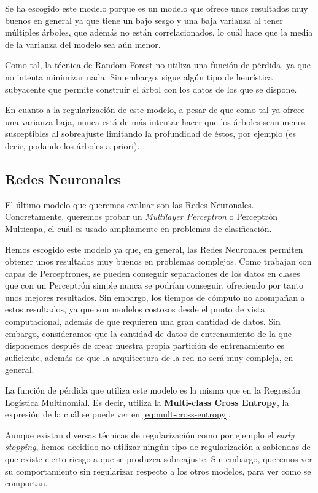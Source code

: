\documentclass[11pt,a4paper]{article}
\begin{document}
Se ha escogido este modelo porque es un modelo que ofrece unos resultados muy buenos en general ya que tiene un bajo sesgo y una baja varianza
al tener múltiples árboles, que además no están correlacionados, lo cuál hace que la media de la varianza del modelo sea aún menor.

Como tal, la técnica de Random Forest no utiliza una función de pérdida, ya que no intenta minimizar nada. Sin embargo, sigue algún tipo de
heurística subyacente que permite construir el árbol con los datos de los que se dispone.

En cuanto a la regularización de este modelo, a pesar de que como tal ya ofrece una varianza baja, nunca está de más intentar hacer que
los árboles sean menos susceptibles al sobreajuste limitando la profundidad de éstos, por ejemplo (es decir, podando los árboles a priori).

\subsection{Redes Neuronales}

El último modelo que queremos evaluar son las Redes Neuronales. Concretamente, queremos probar un \textit{Multilayer Perceptron} o Perceptrón
Multicapa, el cuál es usado ampliamente en problemas de clasificación.

Hemos escogido este modelo ya que, en general, las Redes Neuronales permiten obtener unos resultados muy buenos en problemas complejos.
Como trabajan con capas de Perceptrones, se pueden conseguir separaciones de los datos en clases que con un Perceptrón simple nunca se
podrían conseguir, ofreciendo por tanto unos mejores resultados. Sin embargo, los tiempos de cómputo no acompañan a estos resultados, ya que
son modelos costosos desde el punto de vista computacional, además de que requieren una gran cantidad de datos. Sin embargo, consideramos que
la cantidad de datos de entrenamiento de la que disponemos después de crear nuestra propia partición de entrenamiento es suficiente, además
de que la arquitectura de la red no será muy compleja, en general.

La función de pérdida que utiliza este modelo es la misma que en la Regresión Logística Multinomial. Es decir, utiliza la \textbf{Multi-class
Cross Entropy}, la expresión de la cuál se puede ver en \eqref{eq:mult-cross-entropy}.

Aunque existan diversas técnicas de regularización como por ejemplo el \textit{early stopping}, hemos decidido no utilizar ningún tipo de
regularización a sabiendas de que existe cierto riesgo a que se produzca sobreajuste. Sin embargo, queremos ver su comportamiento sin
regularizar respecto a los otros modelos, para ver como se comportan.
\end{document}
